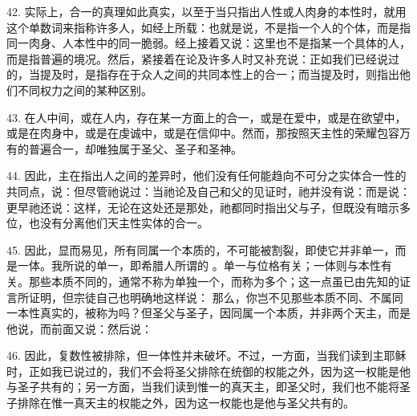 42. 实际上，合一的真理如此真实，以至于当只指出人性或人肉身的本性时，就用这个单数词来指称许多人，如经上所载：也就是说，不是指一个人的个体，而是指同一肉身、人本性中的同一脆弱。经上接着又说：这里也不是指某一个具体的人，而是指普遍的境况。然后，紧接着在论及许多人时又补充说：正如我们已经说过的，当提及时，是指存在于众人之间的共同本性上的合一；而当提及时，则指出他们不同权力之间的某种区别。\par

43. 在人中间，或在人内，存在某一方面上的合一，或是在爱中，或是在欲望中，或是在肉身中，或是在虔诚中，或是在信仰中。然而，那按照天主性的荣耀包容万有的普遍合一，却唯独属于圣父、圣子和圣神。\par

44. 因此，主在指出人之间的差异时，他们没有任何能趋向不可分之实体合一性的共同点，说：但尽管祂说过：当祂论及自己和父的见证时，祂并没有说：而是说：更早祂还说：这样，无论在这处还是那处，祂都同时指出父与子，但既没有暗示多位，也没有分离他们天主性实体的合一。\par

45. 因此，显而易见，所有同属一个本质的，不可能被割裂，即使它并非单一，而是一体。我所说的单一，即希腊人所谓的 。单一与位格有关；一体则与本性有关。那些本质不同的，通常不称为单独一个，而称为多个；这一点虽已由先知的证言所证明，但宗徒自己也明确地这样说：  那么，你岂不见那些本质不同、不属同一本性真实的，被称为吗？但圣父与圣子，因同属一个本质，并非两个天主，而是   他说，而前面又说：然后说： \par

46. 因此，复数性被排除，但一体性并未破坏。不过，一方面，当我们读到主耶稣时，正如我已说过的，我们不会将圣父排除在统御的权能之外，因为这一权能是他与圣子共有的；另一方面，当我们读到惟一的真天主，即圣父时，我们也不能将圣子排除在惟一真天主的权能之外，因为这一权能也是他与圣父共有的。\par

